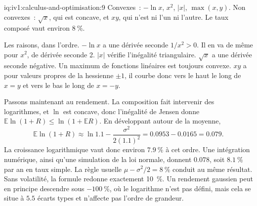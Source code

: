 \begin{solution}{iq:iv1:calculus-and-optimisation:9}
Convexes~: $-\ln x$, $x^2$, $|x|$, $\max(x, y)$. Non convexes~: $\sqrt{x}$, qui est concave, et $xy$, qui n'est ni l'un ni l'autre. Le taux composé vaut environ $8~\%$.

Les raisons, dans l'ordre. $-\ln x$ a une dérivée seconde $1/x^2 > 0$. Il en va de même pour $x^2$, de dérivée seconde 2. $|x|$ vérifie l'inégalité triangulaire. $\sqrt{x}$ a une dérivée seconde négative. Un maximum de fonctions linéaires est toujours convexe. $xy$ a pour valeurs propres de la hessienne $\pm 1$, il courbe donc vers le haut le long de $x = y$ et vers le bas le long de $x = -y$.

Passons maintenant au rendement. La composition fait intervenir des logarithmes, et $\ln$ est concave, donc l'inégalité de Jensen donne $\mathbb{E}\ln(1 + R) \le \ln(1 + \mathbb{E}R)$. En développant autour de la moyenne,
\[
\mathbb{E}\ln(1 + R) \approx \ln 1.1 - \frac{\sigma^2}{2(1.1)^2} = 0.0953 - 0.0165 = 0.079.
\]
La croissance logarithmique vaut donc environ $7.9~\%$ à cet ordre. Une intégration numérique, ainsi qu'une simulation de la loi normale, donnent $0.078$, soit $8.1~\%$ par an en taux simple. La règle usuelle $\mu - \sigma^2/2 = 8~\%$ conduit au même résultat. Sans volatilité, la formule redonne exactement 10~\%. Un rendement gaussien peut en principe descendre sous $-100~\%$, où le logarithme n'est pas défini, mais cela se situe à $5.5$ écarts types et n'affecte pas l'ordre de grandeur.



\end{solution}

